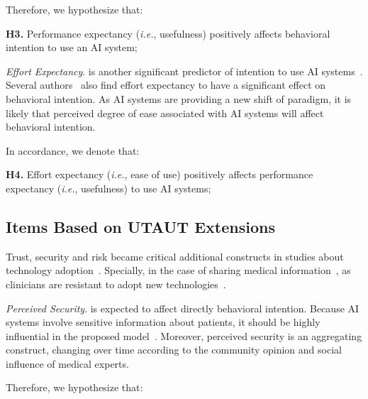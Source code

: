 \vspace{2.25mm}

\noindent
Therefore, we hypothesize that:

\vspace{2.25mm}

\noindent
{\bf H3.} Performance expectancy ({\it i.e.}, usefulness) positively affects behavioral intention to use an AI system;

{\it Effort Expectancy}. is another significant predictor of intention to use AI systems~\cite{doi:10.5465/amr.2019.0178}.
Several authors~\cite{Fan2020, Tran2021} also find effort expectancy to have a significant effect on behavioral intention.
As AI systems are providing a new shift of paradigm, it is likely that perceived degree of ease associated with AI systems will affect behavioral intention.

\noindent
In accordance, we denote that:

\vspace{2.25mm}

\noindent
{\bf H4.} Effort expectancy ({\it i.e.}, ease of use) positively affects performance expectancy ({\it i.e.}, usefulness) to use AI systems;

\subsection{Items Based on UTAUT Extensions}
\label{sec:chap004003002}

Trust, security and risk became critical additional constructs in studies about technology adoption~\cite{KHALILZADEH2017460, https://doi.org/10.1002/mar.20823}.
Specially, in the case of sharing medical information~\cite{6038852}, as clinicians are resistant to adopt new technologies~\cite{10.1145/3132272.3134111}.

\vspace{2.25mm}

{\it Perceived Security}. is expected to affect directly behavioral intention.
Because AI systems involve sensitive information about patients, it should be highly influential in the proposed model~\cite{KHALILZADEH2017460}.
Moreover, perceived security is an aggregating construct, changing over time according to the community opinion and social influence of medical experts.

\vspace{2.25mm}

\noindent
Therefore, we hypothesize that:

\vspace{2.25mm}

